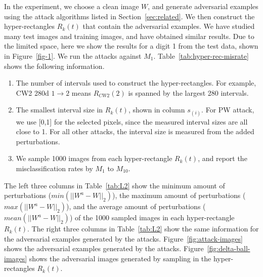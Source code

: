 \documentclass[12pt]{article}
\begin{document}
In the experiment, we choose a clean image $W$, and generate
adversarial examples using the attack algorithms listed in
Section~\ref{sec:related}. We then construct the 
hyper-rectangles $R_k(t)$ that 
contain the adversarial examples. We  have studied many test images and
training images, and  have obtained similar results. Due to the limited
space, here we show the 
results for a digit 1 from the test data, shown in
Figure~\ref{fig-1}. We run the attacks against $M_1$. 
Table~\ref{tab:hyper-rec-misrate} shows the following information.
%
\begin{enumerate}
\item The number of intervals used to construct the
  hyper-rectangles. For example, CW2 280d $1\to 2$ means $R_{CW2}(2)$
  is spanned by the largest 280 intervals.
  
\item The smallest interval size in $R_k(t)$, shown in column
$s_{(i)}$. For PW attack, we use  [0,1] for the selected
pixels, since the measured interval sizes are all close to 1. For all other
attacks, the interval size is measured from the added perturbations.
\item We sample 1000 images from each hyper-rectangle $R_k(t)$, and report the
  misclassification rates by $M_1$ to $M_{10}$. 
\end{enumerate}
%
The left three columns in Table~\ref{tab:L2} show the minimum amount
of perturbations ($min(||W^a-W||_2)$), the maximum amount of
perturbations ($max(||W^a-W||_2)$), and the average amount of
perturbations ($mean(||W^a-W||_2)$) of the 1000 sampled images in
each hyper-rectangle $R_k(t)$. The right three columns in
Table~\ref{tab:L2} show the same information for the adversarial
examples generated by the attacks. Figure~\ref{fig:attack-images}
shows the adversarial examples generated by the 
attacks. Figure~\ref{fig:delta-ball-images} shows the adversarial  
images generated by sampling in the hyper-rectangles $R_k(t)$. 
\end{document}
